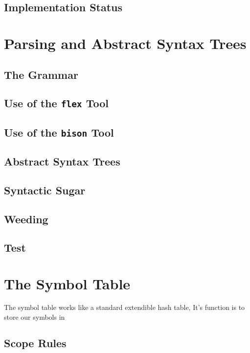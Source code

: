 \documentclass{article}
\begin{document}
\subsection{Implementation Status}

\section{Parsing and Abstract Syntax Trees}

\subsection{The Grammar}

\subsection{Use of the {\tt flex} Tool}

\subsection{Use of the {\tt bison} Tool}

\subsection{Abstract Syntax Trees}

\subsection{Syntactic Sugar}

\subsection{Weeding}

\subsection{Test}

\section{The Symbol Table}
The symbol table works like a standard extendible hash table, It's function is to store our symbols in
\subsection{Scope Rules}
\end{document}
